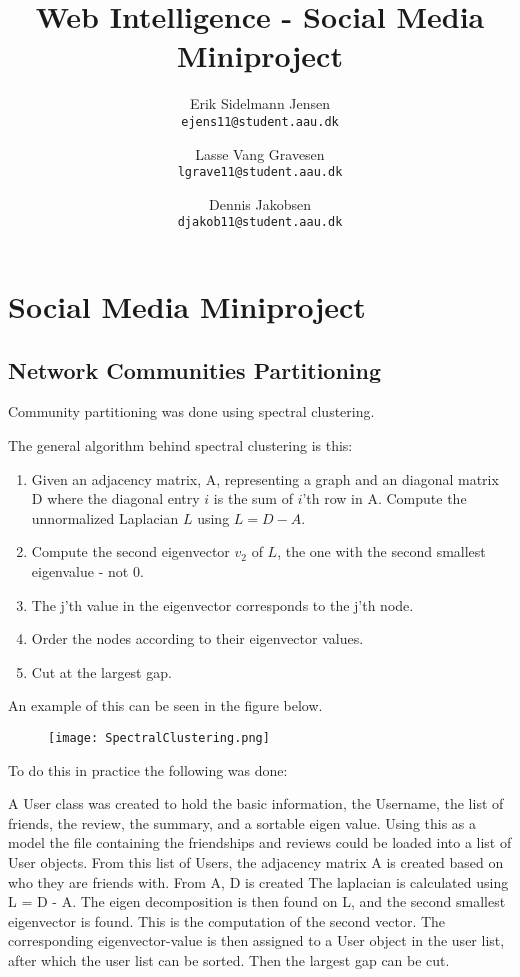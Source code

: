 

\author{
  Erik Sidelmann Jensen\\
  \texttt{ejens11@student.aau.dk}
  \and
  Lasse Vang Gravesen\\
  \texttt{lgrave11@student.aau.dk}
  \and
  Dennis Jakobsen\\
  \texttt{djakob11@student.aau.dk}  
}

\title{Web Intelligence - Social Media Miniproject}
\date{}


	\clearpage\maketitle
	\thispagestyle{empty}
	
	\chapter{Social Media Miniproject}
	\section{Network Communities Partitioning}
	Community partitioning was done using spectral clustering.
	
	The general algorithm behind spectral clustering is this:
	\begin{enumerate}
	\item Given an adjacency matrix, A, representing a graph and an diagonal matrix D where the diagonal entry $i$ is the sum of $i$'th row in A. Compute the unnormalized Laplacian $L$ using $L = D-A$.
	\item Compute the second eigenvector $v_2$ of $L$, the one with the second smallest eigenvalue - not 0.
	\item The j'th value in the eigenvector corresponds to the j'th node.
	\item Order the nodes according to their eigenvector values.
	\item Cut at the largest gap.
	\end{enumerate}
	
	An example of this can be seen in the figure below.
	
	\begin{figure}[H]
	\texttt{[image: SpectralClustering.png]}
	\end{figure}
	
	To do this in practice the following was done:
	
	A User class was created to hold the basic information, the Username, the list of friends, the review, the summary, and a sortable eigen value. 
	Using this as a model the file containing the friendships and reviews could be loaded into a list of User objects.
	From this list of Users, the adjacency matrix A is created based on who they are friends with.
	From A, D is created
	The laplacian is calculated using L = D - A. 
	The eigen decomposition is then found on L, and the second smallest eigenvector is found. This is the computation of the second vector.
	The corresponding eigenvector-value is then assigned to a User object in the user list, after which the user list can be sorted.
	Then the largest gap can be cut. 
	
